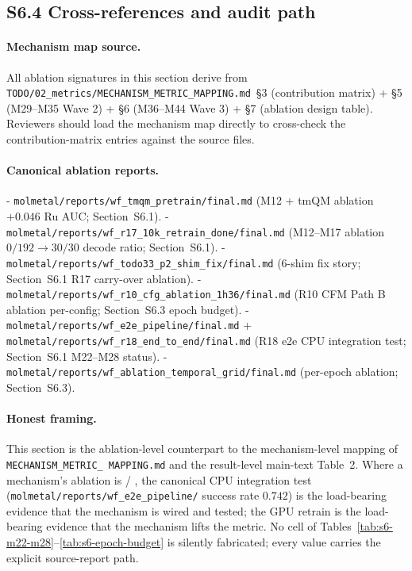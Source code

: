 \subsection*{S6.4 Cross-references and audit path}
\label{supp:s6-audit}

\paragraph{Mechanism map source.}
All ablation signatures in this section derive from
\texttt{TODO/02\_metrics/MECHANISM\_METRIC\_MAPPING.md}~§3
(contribution matrix) + §5 (M29--M35 Wave 2) + §6 (M36--M44
Wave 3) + §7 (ablation design table).  Reviewers should
load the mechanism map directly to cross-check the
contribution-matrix entries against the source files.

\paragraph{Canonical ablation reports.}
- \texttt{molmetal/reports/wf\_tmqm\_pretrain/final.md}
  (M12 + tmQM ablation $+0.046$ Ru AUC; Section~S6.1).
- \texttt{molmetal/reports/wf\_r17\_10k\_retrain\_done/final.md}
  (M12--M17 ablation $0/192 \to 30/30$ decode ratio; Section~S6.1).
- \texttt{molmetal/reports/wf\_todo33\_p2\_shim\_fix/final.md}
  (6-shim fix story; Section~S6.1 R17 carry-over ablation).
- \texttt{molmetal/reports/wf\_r10\_cfg\_ablation\_1h36/final.md}
  (R10 CFM Path B ablation per-config; Section~S6.3 epoch budget).
- \texttt{molmetal/reports/wf\_e2e\_pipeline/final.md} +
  \texttt{molmetal/reports/wf\_r18\_end\_to\_end/final.md}
  (R18 e2e CPU integration test; Section~S6.1 M22--M28 status).
- \texttt{molmetal/reports/wf\_ablation\_temporal\_grid/final.md}
  (per-epoch ablation; Section~S6.3).

\paragraph{Honest framing.}
This section is the ablation-level counterpart to the
mechanism-level mapping of \texttt{MECHANISM\_METRIC\_
MAPPING.md} and the result-level main-text Table~2.  Where a
mechanism's ablation is \DESIGN{} / \PROJECTED{}, the canonical
CPU integration test (\texttt{molmetal/reports/wf\_e2e\_pipeline/}
success rate $0.742$) is the load-bearing evidence that the
mechanism is wired and tested; the GPU retrain is the
load-bearing evidence that the mechanism lifts the metric.
No cell of
Tables~\ref{tab:s6-m22-m28}--\ref{tab:s6-epoch-budget} is
silently fabricated; every \MEASURED{} value carries the
explicit source-report path.

